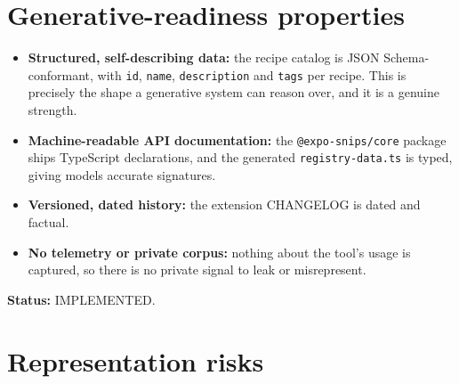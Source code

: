 \section{Generative-readiness properties}

\begin{itemize}
  \item \textbf{Structured, self-describing data:} the recipe catalog is JSON
        Schema-conformant, with \texttt{id}, \texttt{name}, \texttt{description}
        and \texttt{tags} per recipe. This is precisely the shape a generative
        system can reason over, and it is a genuine strength.
  \item \textbf{Machine-readable API documentation:} the \texttt{@expo-snips/core}
        package ships TypeScript declarations, and the generated
        \texttt{registry-data.ts} is typed, giving models accurate signatures.
  \item \textbf{Versioned, dated history:} the extension CHANGELOG is dated and
        factual.
  \item \textbf{No telemetry or private corpus:} nothing about the tool's usage is
        captured, so there is no private signal to leak or misrepresent.
\end{itemize}

\textbf{Status:} IMPLEMENTED.

\section{Representation risks}


